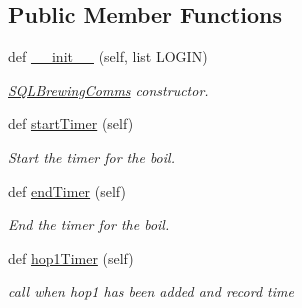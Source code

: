 \subsection*{Public Member Functions}
\begin{DoxyCompactItemize}
\item 
\mbox{\label{classsql_brewing_comms_1_1_s_q_l_boil_ac83bafcbba2e44360da4e9368433e0a3}} 
def \mbox{\hyperlink{classsql_brewing_comms_1_1_s_q_l_boil_ac83bafcbba2e44360da4e9368433e0a3}{\+\_\+\+\_\+init\+\_\+\+\_\+}} (self, list L\+O\+G\+IN)
\begin{DoxyCompactList}\small\item\em \mbox{\hyperlink{classsql_brewing_comms_1_1_s_q_l_brewing_comms}{S\+Q\+L\+Brewing\+Comms}} constructor. \end{DoxyCompactList}\item 
\mbox{\label{classsql_brewing_comms_1_1_s_q_l_boil_a3071bb262356937a3a73fc5a6f2a0e2e}} 
def \mbox{\hyperlink{classsql_brewing_comms_1_1_s_q_l_boil_a3071bb262356937a3a73fc5a6f2a0e2e}{start\+Timer}} (self)
\begin{DoxyCompactList}\small\item\em Start the timer for the boil. \end{DoxyCompactList}\item 
\mbox{\label{classsql_brewing_comms_1_1_s_q_l_boil_a3b237dcfe54d64ea43bab80cffe54cde}} 
def \mbox{\hyperlink{classsql_brewing_comms_1_1_s_q_l_boil_a3b237dcfe54d64ea43bab80cffe54cde}{end\+Timer}} (self)
\begin{DoxyCompactList}\small\item\em End the timer for the boil. \end{DoxyCompactList}\item 
\mbox{\label{classsql_brewing_comms_1_1_s_q_l_boil_a9d0a7ca3d93976455de7a0118d2784f2}} 
def \mbox{\hyperlink{classsql_brewing_comms_1_1_s_q_l_boil_a9d0a7ca3d93976455de7a0118d2784f2}{hop1\+Timer}} (self)
\begin{DoxyCompactList}\small\item\em call when hop1 has been added and record time \end{DoxyCompactList}\item 

\end{DoxyCompactItemize}
